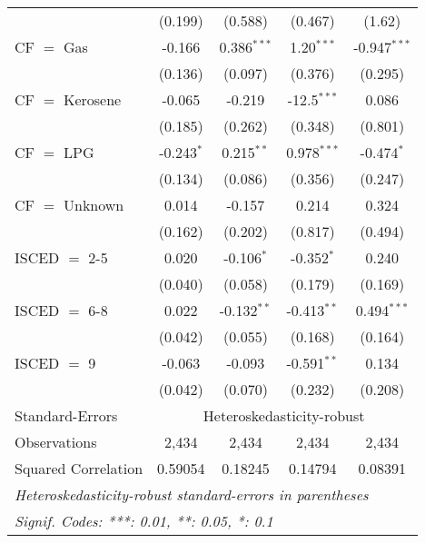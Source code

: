 \begin{table}[htbp!]
\begin{adjustbox}{width = 1\textwidth, max height = 0.95\textheight, center}
\begin{threeparttable}[b]
\begin{tabular}{lcccc}
                                 & (0.199)            & (0.588)            & (0.467)       & (1.62)\\   
            CF $=$ Gas           & -0.166             & 0.386$^{***}$      & 1.20$^{***}$  & -0.947$^{***}$\\   
                                 & (0.136)            & (0.097)            & (0.376)       & (0.295)\\   
            CF $=$ Kerosene      & -0.065             & -0.219             & -12.5$^{***}$ & 0.086\\   
                                 & (0.185)            & (0.262)            & (0.348)       & (0.801)\\   
            CF $=$ LPG           & -0.243$^{*}$       & 0.215$^{**}$       & 0.978$^{***}$ & -0.474$^{*}$\\   
                                 & (0.134)            & (0.086)            & (0.356)       & (0.247)\\   
            CF $=$ Unknown       & 0.014              & -0.157             & 0.214         & 0.324\\   
                                 & (0.162)            & (0.202)            & (0.817)       & (0.494)\\   
            ISCED $=$ 2-5        & 0.020              & -0.106$^{*}$       & -0.352$^{*}$  & 0.240\\   
                                 & (0.040)            & (0.058)            & (0.179)       & (0.169)\\   
            ISCED $=$ 6-8        & 0.022              & -0.132$^{**}$      & -0.413$^{**}$ & 0.494$^{***}$\\   
                                 & (0.042)            & (0.055)            & (0.168)       & (0.164)\\   
            ISCED $=$ 9          & -0.063             & -0.093             & -0.591$^{**}$ & 0.134\\   
                                 & (0.042)            & (0.070)            & (0.232)       & (0.208)\\   
            \midrule 
            Standard-Errors & \multicolumn{4}{c}{Heteroskedasticity-robust} \\ 
            Observations         & 2,434              & 2,434              & 2,434         & 2,434\\  
            Squared Correlation  & 0.59054            & 0.18245            & 0.14794       & 0.08391\\  
            \midrule \midrule
            \multicolumn{5}{l}{\emph{Heteroskedasticity-robust standard-errors in parentheses}}\\
            \multicolumn{5}{l}{\emph{Signif. Codes: ***: 0.01, **: 0.05, *: 0.1}}\\
         \end{tabular}
         

\end{threeparttable}
\end{adjustbox}
\end{table}
